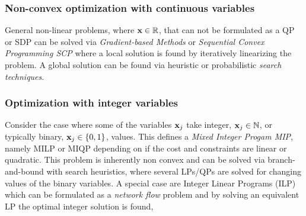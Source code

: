 \subsubsection{Non-convex optimization with continuous variables}
General non-linear problems, where $\textbf{x} \in \mathbb{R}$, that can not be formulated as a QP or SDP can be solved via \emph{Gradient-based Methods} or \emph{Sequential Convex Programming SCP} where a local solution is found by iteratively linearizing the problem. A global solution can be found via heuristic or probabilistic \emph{search techniques}.  

\subsubsection{Optimization with integer variables}
Consider the case where some of the variables $\textbf{x}_j$ take integer, $\textbf{x}_j \in \mathbb{N}$, or typically binary, $\textbf{x}_j \in \{0,1\}$, values.
This defines a \emph{Mixed Integer Progam MIP}, namely MILP or MIQP depending on if the cost and constraints are linear or quadratic. This problem is inherently non convex and can be solved via branch-and-bound with search heuristics, where several LPs/QPs are solved for changing values of the binary variables. A special case are Integer Linear Programs (ILP) which can be formulated as a \emph{network flow} problem and by solving an equivalent LP the optimal integer solution is found,



